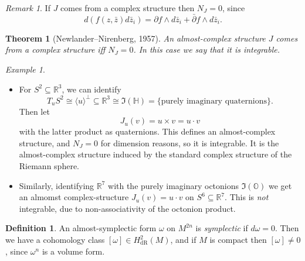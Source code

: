 \documentclass[a4paper]{article}
\newtheorem*{theorem}{Theorem}
\theoremstyle{definition}
\newtheorem*{definition}{Definition}
\theoremstyle{remark}
\newtheorem*{example}{Example}
\newtheorem*{remark}{Remark}
\newcommand{\dR}{\text{dR}}
\renewcommand{\H}{\mathbb{H}}
\renewcommand{\O}{\mathbb{O}}
\newcommand{\R}{\mathbb{R}}
\begin{document}
\begin{remark}
    If $J$ comes from a complex structure then $N_J=0$, since
    \begin{equation*}
        d(f(z,\bar z)d\bar z_i)
            = \partial f\wedge d\bar z_i + \bar\partial f\wedge d\bar z_i.
    \end{equation*}
\end{remark}

\begin{theorem}[Newlander--Nirenberg, 1957]
    An almost-complex structure $J$ comes from a complex structure iff $N_J=0$.
    In this case we say that it is \emph{integrable}.
\end{theorem}

\begin{example}
    ~
    \begin{itemize}
        \item For $S^2\subseteq\R^3$, we can identify
            \begin{equation*}
                T_uS^2 \cong \langle u\rangle^\perp\subseteq\R^3
                    \cong \Im(\H) = \{\text{purely imaginary quaternions}\}.
            \end{equation*}
            Then let
            \begin{equation*}
                J_u(v) = u\times v = u\cdot v
            \end{equation*}
            with the latter product as quaternions. This defines an
            almost-complex structure, and $N_J=0$ for dimension reasons, so it
            is integrable. It is the almost-complex structure induced by the
            standard complex structure of the Riemann sphere.

        \item Similarly, identifying $\R^7$ with the purely imaginary octonions
            $\Im(\O)$ we get an almomst complex-structure $J_u(v)=u\cdot v$ on
            $S^6\subseteq\R^7$. This is \emph{not} integrable, due to
            non-associativity of the octonion product.
    \end{itemize}
\end{example}

\begin{definition}
    An almost-symplectic form $\omega$ on $M^{2n}$ is \emph{symplectic} if
    $d\omega=0$. Then we have a cohomology class $[\omega]\in H^2_\dR(M)$, and
    if $M$ is compact then $[\omega]\ne0$, since $\omega^n$ is a volume form.
\end{definition}
\end{document}
